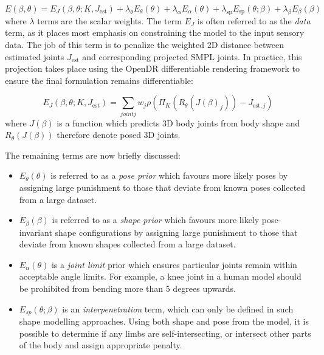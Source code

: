         \begin{equation}
        E(\beta, \theta) = E_{J}(\beta, \theta; K, J_{\text{est}}) + \lambda_{\theta}E_{\theta}(\theta) + \lambda_{\alpha}E_{\alpha}(\theta) + \lambda_{\text{sp}}E_{\text{sp}}(\theta; \beta) + \lambda_{\beta}E_{\beta}(\beta)
        \end{equation}
        where $\lambda$ terms are the scalar weights. The term $E_{J}$ is often referred to as the \textit{data} term, as it places most emphasis on constraining the model to the input sensory data. The job of this term is to penalize the weighted 2D distance between estimated joints $J_{\text{est}}$ and corresponding projected SMPL joints. In practice, this projection takes place using the OpenDR differentiable rendering framework to ensure the final formulation remains differentiable:

        \begin{equation}
            E_{J}(\beta, \theta; K, J_{\text{est}}) = \sum_{joint j} w_{j} \rho(\Pi_{K}(R_{\theta}(J(\beta)_j)) - J_{\text{est}, j})
        \end{equation}
        where $J(\beta)$ is a function which predicts 3D body joints from body shape and $R_{\theta}(J(\beta))$ therefore denote posed 3D joints.

        The remaining terms are now briefly discussed:
        \clearpage
        \begin{itemize}
            \item $E_{\theta}(\theta)$ is referred to as a \textit{pose prior} which favours more likely poses by assigning large punishment to those that deviate from known poses collected from a large dataset.
            \item $E_{\beta}(\beta)$ is referred to as a \textit{shape prior} which favours more likely pose-invariant shape configurations by assigning large punishment to those that deviate from known shapes collected from a large dataset. 
            \item $E_{\alpha}(\theta)$ is a \textit{joint limit} prior which ensures particular joints remain within acceptable angle limits. For example, a knee joint in a human model should be prohibited from bending more than 5 degrees upwards.
            \item $E_{sp}(\theta; \beta)$ is an \textit{interpenetration} term, which can only be defined in such shape modelling approaches. Using both shape and pose from the model, it is possible to determine if any limbs are self-intersecting, or intersect other parts of the body and assign appropriate penalty.
        \end{itemize}

